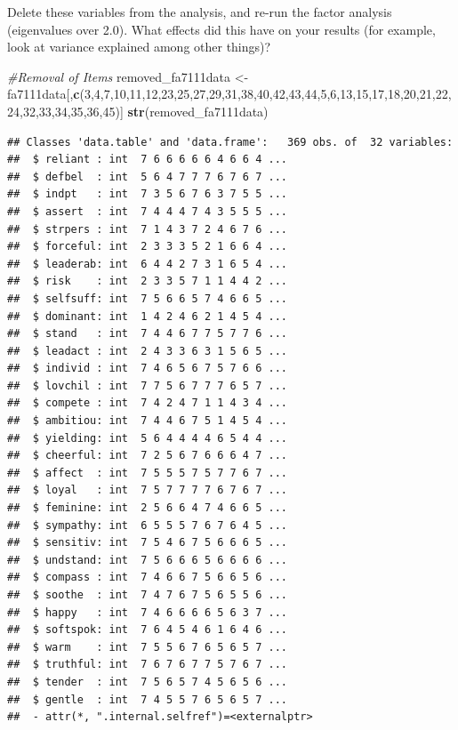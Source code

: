 \documentclass[]{book}
\newenvironment{Shaded}{\begin{snugshade}}{\end{snugshade}}
\newcommand{\KeywordTok}[1]{\textcolor[rgb]{0.13,0.29,0.53}{\textbf{#1}}}
\newcommand{\DecValTok}[1]{\textcolor[rgb]{0.00,0.00,0.81}{#1}}
\newcommand{\StringTok}[1]{\textcolor[rgb]{0.31,0.60,0.02}{#1}}
\newcommand{\CommentTok}[1]{\textcolor[rgb]{0.56,0.35,0.01}{\textit{#1}}}
\newcommand{\NormalTok}[1]{#1}
\theoremstyle{definition}
\theoremstyle{definition}
\theoremstyle{definition}
\theoremstyle{remark}
\begin{document}
Delete these variables from the analysis, and re-run the factor analysis
(eigenvalues over 2.0). What effects did this have on your results (for
example, look at variance explained among other things)?

\begin{Shaded}
\begin{Highlighting}[]
\CommentTok{#Removal of Items}
\NormalTok{removed_fa7111data <-}\StringTok{ }\NormalTok{fa7111data[,}\KeywordTok{c}\NormalTok{(}\DecValTok{3}\NormalTok{,}\DecValTok{4}\NormalTok{,}\DecValTok{7}\NormalTok{,}\DecValTok{10}\NormalTok{,}\DecValTok{11}\NormalTok{,}\DecValTok{12}\NormalTok{,}\DecValTok{23}\NormalTok{,}\DecValTok{25}\NormalTok{,}\DecValTok{27}\NormalTok{,}\DecValTok{29}\NormalTok{,}\DecValTok{31}\NormalTok{,}\DecValTok{38}\NormalTok{,}\DecValTok{40}\NormalTok{,}\DecValTok{42}\NormalTok{,}\DecValTok{43}\NormalTok{,}\DecValTok{44}\NormalTok{,}\DecValTok{5}\NormalTok{,}\DecValTok{6}\NormalTok{,}\DecValTok{13}\NormalTok{,}\DecValTok{15}\NormalTok{,}\DecValTok{17}\NormalTok{,}\DecValTok{18}\NormalTok{,}\DecValTok{20}\NormalTok{,}\DecValTok{21}\NormalTok{,}\DecValTok{22}\NormalTok{,}\DecValTok{24}\NormalTok{,}\DecValTok{32}\NormalTok{,}\DecValTok{33}\NormalTok{,}\DecValTok{34}\NormalTok{,}\DecValTok{35}\NormalTok{,}\DecValTok{36}\NormalTok{,}\DecValTok{45}\NormalTok{)]}
\KeywordTok{str}\NormalTok{(removed_fa7111data)}
\end{Highlighting}
\end{Shaded}

\begin{verbatim}
## Classes 'data.table' and 'data.frame':   369 obs. of  32 variables:
##  $ reliant : int  7 6 6 6 6 6 4 6 6 4 ...
##  $ defbel  : int  5 6 4 7 7 7 6 7 6 7 ...
##  $ indpt   : int  7 3 5 6 7 6 3 7 5 5 ...
##  $ assert  : int  7 4 4 4 7 4 3 5 5 5 ...
##  $ strpers : int  7 1 4 3 7 2 4 6 7 6 ...
##  $ forceful: int  2 3 3 3 5 2 1 6 6 4 ...
##  $ leaderab: int  6 4 4 2 7 3 1 6 5 4 ...
##  $ risk    : int  2 3 3 5 7 1 1 4 4 2 ...
##  $ selfsuff: int  7 5 6 6 5 7 4 6 6 5 ...
##  $ dominant: int  1 4 2 4 6 2 1 4 5 4 ...
##  $ stand   : int  7 4 4 6 7 7 5 7 7 6 ...
##  $ leadact : int  2 4 3 3 6 3 1 5 6 5 ...
##  $ individ : int  7 4 6 5 6 7 5 7 6 6 ...
##  $ lovchil : int  7 7 5 6 7 7 7 6 5 7 ...
##  $ compete : int  7 4 2 4 7 1 1 4 3 4 ...
##  $ ambitiou: int  7 4 4 6 7 5 1 4 5 4 ...
##  $ yielding: int  5 6 4 4 4 4 6 5 4 4 ...
##  $ cheerful: int  7 2 5 6 7 6 6 6 4 7 ...
##  $ affect  : int  7 5 5 5 7 5 7 7 6 7 ...
##  $ loyal   : int  7 5 7 7 7 7 6 7 6 7 ...
##  $ feminine: int  2 5 6 6 4 7 4 6 6 5 ...
##  $ sympathy: int  6 5 5 5 7 6 7 6 4 5 ...
##  $ sensitiv: int  7 5 4 6 7 5 6 6 6 5 ...
##  $ undstand: int  7 5 6 6 6 5 6 6 6 6 ...
##  $ compass : int  7 4 6 6 7 5 6 6 5 6 ...
##  $ soothe  : int  7 4 7 6 7 5 6 5 5 6 ...
##  $ happy   : int  7 4 6 6 6 6 5 6 3 7 ...
##  $ softspok: int  7 6 4 5 4 6 1 6 4 6 ...
##  $ warm    : int  7 5 5 6 7 6 5 6 5 7 ...
##  $ truthful: int  7 6 7 6 7 7 5 7 6 7 ...
##  $ tender  : int  7 5 6 5 7 4 5 6 5 6 ...
##  $ gentle  : int  7 4 5 5 7 6 5 6 5 7 ...
##  - attr(*, ".internal.selfref")=<externalptr>
\end{verbatim}
\end{document}
